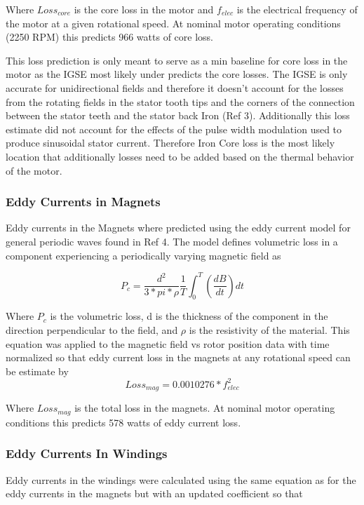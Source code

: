 \documentclass[]{aiaa-tc}%
\begin{document}
Where $Loss_{core}$ is the core loss in the motor and $f_{elec}$ is the electrical frequency of the motor at a given rotational speed. At nominal motor operating conditions (2250 RPM) this predicts 966 watts of core loss. 

This loss prediction is only meant to serve as a min baseline for core loss in the motor as the IGSE most likely under predicts the core losses. The IGSE is only accurate for unidirectional fields and therefore it doesn’t account for the losses from the rotating fields in the stator tooth tips and the corners of the connection between the stator teeth and the stator back Iron (Ref 3). Additionally this loss estimate did not account for the effects of the pulse width modulation used to produce sinusoidal stator current. Therefore Iron Core loss is the most likely location that additionally losses need to be added based on the thermal behavior of the motor. 
\subsubsection{Eddy Currents in Magnets}
Eddy currents in the Magnets where predicted using the eddy current model for general periodic waves found in Ref 4. The model defines volumetric loss in a component experiencing a periodically varying magnetic field as 

\begin{equation}
P_{c} = \frac{d^2}{3*pi*\rho}\frac{1}{T}\int_{0}^{T}(\frac{dB}{dt})dt
\label{eq:EddyLoss}
\end{equation}

Where $P_{c}$ is the volumetric loss, d is the thickness of the component in the direction perpendicular to the field, and $\rho$ is the resistivity of the material. This equation was applied to the magnetic field vs rotor position data with time normalized so that eddy current loss in the magnets at any rotational speed can be estimate by 
\begin{equation}
Loss_{mag} = 0.0010276*f_{elec}^{2}
\label{eq:EddyLoss2}
\end{equation}

Where $Loss_{mag}$ is the total loss in the magnets. At nominal motor operating conditions this predicts 578 watts of eddy current loss.

\subsubsection{Eddy Currents In Windings}
Eddy currents in the windings were calculated using the same equation as for the eddy currents in the magnets but with an updated coefficient so that
\end{document}

